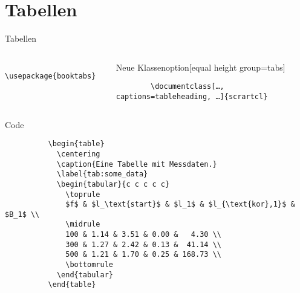 \section{Tabellen}

\begin{frame}[fragile]{
  Tabellen
  \hfill
}
  \begin{columns}[t]
    \begin{column}{0.33\textwidth}
      \begin{Packages}[equal height group=tabs]
        \begin{lstlisting}
          \usepackage{booktabs}
        \end{lstlisting}
      \end{Packages}
    \end{column}
    \begin{column}{0.63\textwidth}
    \begin{block}{Neue Klassenoption}[equal height group=tabs]
      \begin{lstlisting}
        \documentclass[…, captions=tableheading, …]{scrartcl}
      \end{lstlisting}
    \end{block}
    \end{column}
  \end{columns}
  \vspace{-2pt}
  \begin{columns}[onlytextwidth, t]
    \begin{column}{0.60\textwidth}
      \fontsize{8}{6}
      \begin{block}{Code}
        \begin{lstlisting}
          \begin{table}
            \centering
            \caption{Eine Tabelle mit Messdaten.}
            \label{tab:some_data}
            \begin{tabular}{c c c c c}
              \toprule
              $f$ & $l_\text{start}$ & $l_1$ & $l_{\text{kor},1}$ & $B_1$ \\
              \midrule
              100 & 1.14 & 3.51 & 0.00 &   4.30 \\
              300 & 1.27 & 2.42 & 0.13 &  41.14 \\
              500 & 1.21 & 1.70 & 0.25 & 168.73 \\
              \bottomrule
            \end{tabular}
          \end{table}

\end{lstlisting}
\end{block}
\end{column}
\end{columns}
\end{frame}
